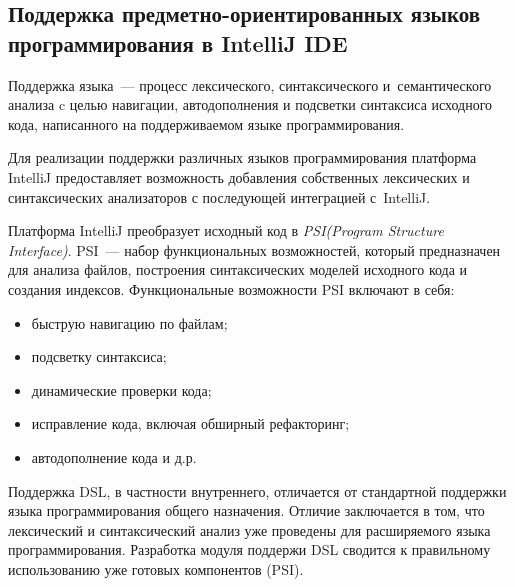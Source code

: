 \subsection{Поддержка предметно-ориентированных языков программирования в IntelliJ IDE} \label{sub132}

Поддержка языка~--- процесс лексического, синтаксического и~семантического анализа c целью навигации, автодополнения и подсветки синтаксиса исходного кода, написанного на поддерживаемом языке программирования. 

Для реализации поддержки различных языков программирования платформа IntelliJ предоставляет возможность добавления собственных лексических и синтаксических анализаторов с последующей интеграцией с~IntelliJ.

Платформа IntelliJ преобразует исходный код в \textit{PSI(Program Structure Interface)}. PSI~--- набор функциональных возможностей, который предназначен для анализа файлов, построения синтаксических моделей исходного кода и создания индексов. Функциональные возможности PSI включают в себя:

\begin{itemize}
\item{быструю навигацию по файлам;}
\item{подсветку синтаксиса;}
\item{динамические проверки кода;}
\item{исправление кода, включая обширный рефакторинг;}
\item{автодополнение кода и д.р.}
\end{itemize}

Поддержка DSL, в частности внутреннего, отличается от стандартной поддержки языка программирования общего назначения. Отличие заключается в том, что лексический и синтаксический анализ уже проведены для расширяемого языка программирования. Разработка модуля поддержи DSL сводится к правильному использованию уже готовых компонентов (PSI).
